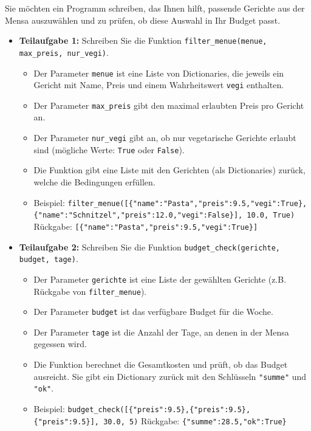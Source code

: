 \begin{myexercise}

	Sie möchten ein Programm schreiben, das Ihnen hilft, passende Gerichte aus der Mensa auszuwählen und zu prüfen, ob diese Auswahl in Ihr Budget passt.

	\begin{itemize}
		\item \textbf{Teilaufgabe 1:} Schreiben Sie die Funktion \lstinline{filter_menue(menue, max_preis, nur_vegi)}.
		      \begin{itemize}
			      \item Der Parameter \lstinline{menue} ist eine Liste von Dictionaries, die jeweils ein Gericht mit Name, Preis und einem Wahrheitswert \lstinline{vegi} enthalten.
			      \item Der Parameter \lstinline{max_preis} gibt den maximal erlaubten Preis pro Gericht an.
			      \item Der Parameter \lstinline{nur_vegi} gibt an, ob nur vegetarische Gerichte erlaubt sind (mögliche Werte: \lstinline{True} oder \lstinline{False}).
			      \item Die Funktion gibt eine Liste mit den Gerichten (als Dictionaries) zurück, welche die Bedingungen erfüllen.
			      \item Beispiel: \lstinline|filter_menue([{"name":"Pasta","preis":9.5,"vegi":True},{"name":"Schnitzel","preis":12.0,"vegi":False}], 10.0, True)|
			            \newline Rückgabe: \lstinline|[{"name":"Pasta","preis":9.5,"vegi":True}]|
		      \end{itemize}

		\item \textbf{Teilaufgabe 2:} Schreiben Sie die Funktion \lstinline{budget_check(gerichte, budget, tage)}.
		      \begin{itemize}
			      \item Der Parameter \lstinline{gerichte} ist eine Liste der gewählten Gerichte (z.B. Rückgabe von \lstinline{filter_menue}).
			      \item Der Parameter \lstinline{budget} ist das verfügbare Budget für die Woche.
			      \item Der Parameter \lstinline{tage} ist die Anzahl der Tage, an denen in der Mensa gegessen wird.
			      \item Die Funktion berechnet die Gesamtkosten und prüft, ob das Budget ausreicht. Sie gibt ein Dictionary zurück mit den Schlüsseln \lstinline{"summe"} und \lstinline{"ok"}.
			      \item Beispiel: \lstinline|budget_check([{"preis":9.5},{"preis":9.5},{"preis":9.5}], 30.0, 5)|
			            \newline Rückgabe: \lstinline|{"summe":28.5,"ok":True}|
		      \end{itemize}
	\end{itemize}


\end{myexercise}
